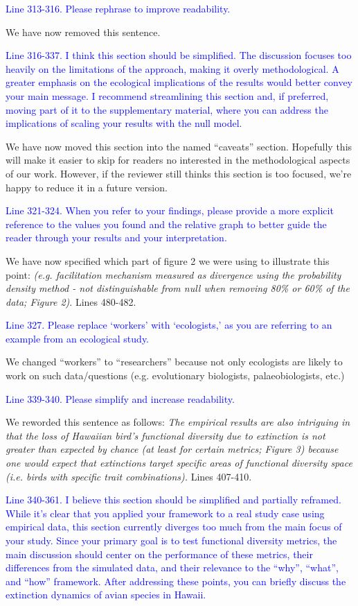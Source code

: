 \documentclass[
]{article}
\begin{document}
\textcolor{blue}{Line 313-316. Please rephrase to improve readability.}

We have now removed this sentence.

\textcolor{blue}{Line 316-337. I think this section should be simplified.
The discussion focuses too heavily on the limitations of the approach, making it overly methodological.
A greater emphasis on the ecological implications of the results would better convey your main message.
I recommend streamlining this section and, if preferred, moving part of it to the supplementary material, where you can address the implications of scaling your results with the null model.}

We have now moved this section into the named ``caveats'' section.
Hopefully this will make it easier to skip for readers no interested in the methodological aspects of our work.
However, if the reviewer still thinks this section is too focused, we're happy to reduce it in a future version.

\textcolor{blue}{Line 321-324. When you refer to your findings, please provide a more explicit reference to the values you found and the relative graph to better guide the reader through your results and your interpretation.}

We have now specified which part of figure 2 we were using to illustrate this point:
\textit{(e.g. facilitation mechanism measured as divergence using the probability density method - not distinguishable from null when removing 80\% or 60\% of the data; Figure 2)}. Lines 480-482.

\textcolor{blue}{Line 327. Please replace `workers' with `ecologists,' as you are referring to an example from an ecological study.}

We changed ``workers'' to ``researchers'' because not only ecologists are likely to work on such data/questions (e.g. evolutionary biologists, palaeobiologists, etc.)

\textcolor{blue}{Line 339-340. Please simplify and increase readability.}

We reworded this sentence as follows:
\textit{The empirical results are also intriguing in that the loss of Hawaiian bird's functional diversity due to extinction is not greater than expected by chance (at least for certain metrics; Figure 3) because one would expect that extinctions target specific areas of functional diversity space (i.e. birds with specific trait combinations).}
Lines 407-410.

\textcolor{blue}{Line 340-361. I believe this section should be simplified and partially reframed.
While it's clear that you applied your framework to a real study case using empirical data, this section currently diverges too much from the main focus of your study.
Since your primary goal is to test functional diversity metrics, the main discussion should center on the performance of these metrics, their differences from the simulated data, and their relevance to the ``why'', ``what'', and ``how'' framework.
After addressing these points, you can briefly discuss the extinction dynamics of avian species in Hawaii.}
\end{document}
